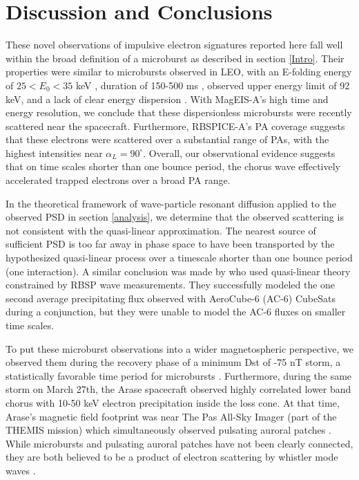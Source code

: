 \section{Discussion and Conclusions} \label{discussion} %
These novel observations of impulsive electron signatures reported here fall well within the broad definition of a microburst as described in section \ref{Intro}. Their properties were similar to microbursts observed in LEO, with an E-folding energy of $25 < E_0 < 35$ keV \citep{Datta1997, Lee2005, Lee2012}, duration of 150-500 ms \citep{Lorentzen2001a}, observed upper energy limit of 92 keV, and a lack of clear energy dispersion \citep{Breneman2017}. With MagEIS-A's high time and energy resolution, we conclude that these dispersionless microbursts were recently scattered near the spacecraft. Furthermore, RBSPICE-A's PA coverage suggests that these electrons were scattered over a substantial range of PAs, with the highest intensities near $\alpha_L = 90^\circ$. Overall, our observational evidence suggests that on time scales shorter than one bounce period, the chorus wave effectively accelerated trapped electrons over a broad PA range. 

In the theoretical framework of wave-particle resonant diffusion applied to the observed PSD in section \ref{analysis}, we determine that the observed scattering is not consistent with the quasi-linear approximation. The nearest source of sufficient PSD is too far away in phase space to have been transported by the hypothesized quasi-linear process over a timescale shorter than one bounce period (one interaction). A similar conclusion was made by \citet{Mozer2018} who used quasi-linear theory constrained by RBSP wave measurements. They successfully modeled the one second average precipitating flux observed with AeroCube-6 (AC-6) CubeSats during a conjunction, but they were unable to model the AC-6 fluxes on smaller time scales.

To put these microburst observations into a wider magnetospheric perspective, we observed them during the recovery phase of a minimum Dst of -75 nT storm, a statistically favorable time period for microbursts \citep{O'Brien2003}. Furthermore, during the same storm on March 27th, the Arase spacecraft observed highly correlated lower band chorus with 10-50 keV electron precipitation inside the loss cone. At that time, Arase's magnetic field footprint was near The Pas All-Sky Imager (part of the THEMIS mission) which simultaneously observed pulsating auroral patches \citep{Kasahara2018}. While microbursts and pulsating auroral patches have not been clearly connected, they are both believed to be a product of electron scattering by whistler mode waves \citep[e.g.][]{Lorentzen2001a, O'Brien2003, Nishimura2011a, Ozaki2012}.

